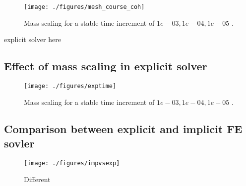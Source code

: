 \documentclass[grain_boundary_law.tex]{subfiles}
\begin{document}
\begin{figure}[htpb!]
\centering
\texttt{[image: ./figures/mesh\_course\_coh]}
\caption{Mass scaling for a stable time increment of $1e-03,1e-04,1e-05$ .}
\label{fig:cohs_large}
\end{figure}


explicit solver here


\subsection{Effect of mass scaling in explicit solver}



\begin{figure}[htpb!]
\centering
\texttt{[image: ./figures/exptime]}
\caption{Mass scaling for a stable time increment of $1e-03,1e-04,1e-05$ .}
\label{fig:cohs_large}
\end{figure}

\subsection{Comparison between explicit and implicit FE sovler}


\begin{figure}[htpb!]
\centering
\texttt{[image: ./figures/impvsexp]}
\caption{Different}
\label{fig:cohs_large}
\end{figure}
\end{document}
